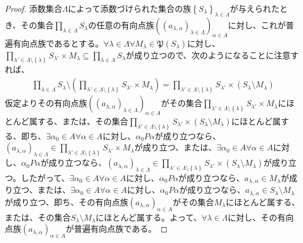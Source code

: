 \documentclass[dvipdfmx]{jsarticle}
\begin{document}
\begin{proof}
添数集合$\varLambda$によって添数づけられた集合の族$\left\{ S_{\lambda} \right\}_{\lambda \in \varLambda}$が与えられたとき、その集合$\prod_{\lambda \in \varLambda} S_{\lambda}$の任意の有向点族$\left( \left( a_{\lambda,\alpha} \right)_{\lambda \in \varLambda} \right)_{\alpha \in A}$に対し、これが普遍有向点族であるとする。$\forall\lambda \in \varLambda\forall M_{\lambda}\in \mathfrak{P}\left( S_{\lambda} \right)$に対し、$\prod_{\lambda' \in \varLambda \setminus \left\{ \lambda \right\}} S_{\lambda'} \times M_{\lambda} \subseteq \prod_{\lambda \in \varLambda} S_{\lambda}$が成り立つので、次のようになることに注意すれば、
\begin{align*}
\prod_{\lambda \in \varLambda} S_{\lambda} \setminus \left( \prod_{\lambda' \in \varLambda \setminus \left\{ \lambda \right\}} S_{\lambda'} \times M_{\lambda} \right) = \prod_{\lambda' \in \varLambda \setminus \left\{ \lambda \right\}} S_{\lambda'} \times \left( S_{\lambda} \setminus M_{\lambda} \right)
\end{align*}
仮定よりその有向点族$\left( \left( a_{\lambda,\alpha} \right)_{\lambda \in \varLambda} \right)_{\alpha \in A}$がその集合$\prod_{\lambda' \in \varLambda \setminus \left\{ \lambda \right\}} S_{\lambda'} \times M_{\lambda}$にほとんど属する、または、その集合$\prod_{\lambda' \in \varLambda \setminus \left\{ \lambda \right\}} S_{\lambda'} \times \left( S_{\lambda} \setminus M_{\lambda} \right)$にほとんど属する、即ち、$\exists\alpha_{0} \in A\forall\alpha \in A$に対し、$\alpha_{0}P\alpha$が成り立つなら、$\left( a_{\lambda,\alpha} \right)_{\lambda \in \varLambda} \in \prod_{\lambda' \in \varLambda \setminus \left\{ \lambda \right\}} S_{\lambda'} \times M_{\lambda}$が成り立つ、または、$\exists\alpha_{0} \in A\forall\alpha \in A$に対し、$\alpha_{0}P\alpha$が成り立つなら、$\left( a_{\lambda,\alpha} \right)_{\lambda \in \varLambda} \in \prod_{\lambda' \in \varLambda \setminus \left\{ \lambda \right\}} S_{\lambda'} \times \left( S_{\lambda} \setminus M_{\lambda} \right)$が成り立つ。したがって、$\exists\alpha_{0} \in A\forall\alpha \in A$に対し、$\alpha_{0}P\alpha$が成り立つなら、$a_{\lambda,\alpha} \in M_{\lambda}$が成り立つ、または、$\exists\alpha_{0} \in A\forall\alpha \in A$に対し、$\alpha_{0}P\alpha$が成り立つなら、$a_{\lambda,\alpha} \in S_{\lambda} \setminus M_{\lambda}$が成り立つ、即ち、その有向点族$\left( a_{\lambda,\alpha} \right)_{\alpha \in A}$がその集合$M_{\lambda}$にほとんど属する、または、その集合$S_{\lambda} \setminus M_{\lambda}$にほとんど属する。よって、$\forall\lambda \in \varLambda$に対し、その有向点族$\left( a_{\lambda,\alpha} \right)_{\alpha \in A}$が普遍有向点族である。
\end{proof}
\end{document}
